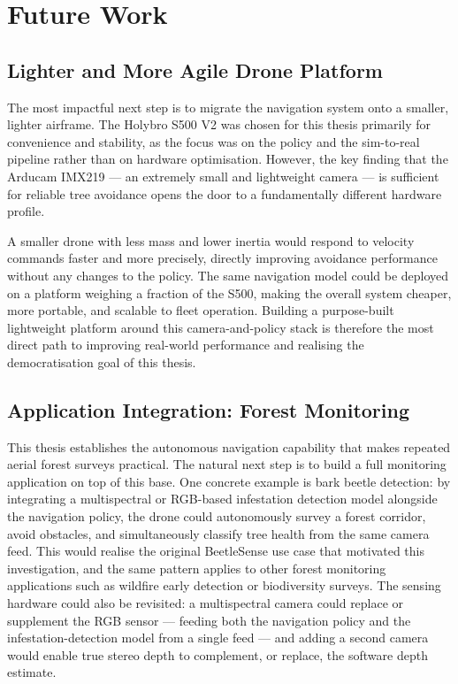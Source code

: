 \documentclass[../main.tex]{subfiles}
\begin{document}
\section{Future Work}
\justify

\subsection{Lighter and More Agile Drone Platform}

The most impactful next step is to migrate the navigation system onto a smaller, lighter airframe. The Holybro S500 V2 was chosen for this thesis primarily for convenience and stability, as the focus was on the policy and the sim-to-real pipeline rather than on hardware optimisation. However, the key finding that the Arducam IMX219 --- an extremely small and lightweight camera --- is sufficient for reliable tree avoidance opens the door to a fundamentally different hardware profile.

A smaller drone with less mass and lower inertia would respond to velocity commands faster and more precisely, directly improving avoidance performance without any changes to the policy. The same navigation model could be deployed on a platform weighing a fraction of the S500, making the overall system cheaper, more portable, and scalable to fleet operation. Building a purpose-built lightweight platform around this camera-and-policy stack is therefore the most direct path to improving real-world performance and realising the democratisation goal of this thesis.

\subsection{Application Integration: Forest Monitoring}

This thesis establishes the autonomous navigation capability that makes repeated aerial forest surveys practical. The natural next step is to build a full monitoring application on top of this base. One concrete example is bark beetle detection: by integrating a multispectral or RGB-based infestation detection model alongside the navigation policy, the drone could autonomously survey a forest corridor, avoid obstacles, and simultaneously classify tree health from the same camera feed. This would realise the original BeetleSense use case that motivated this investigation, and the same pattern applies to other forest monitoring applications such as wildfire early detection or biodiversity surveys. The sensing hardware could also be revisited: a multispectral camera could replace or supplement the RGB sensor --- feeding both the navigation policy and the infestation-detection model from a single feed --- and adding a second camera would enable true stereo depth to complement, or replace, the software depth estimate.
\end{document}
